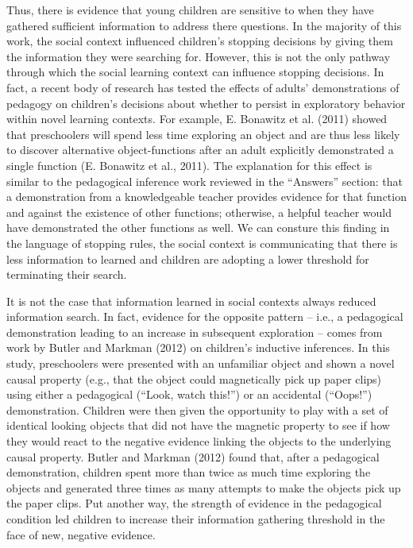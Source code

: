 \documentclass[english,floatsintext,man]{apa6}
\theoremstyle{definition}
\theoremstyle{definition}
\theoremstyle{definition}
\theoremstyle{remark}
\begin{document}
Thus, there is evidence that young children are sensitive to when they
have gathered sufficient information to address there questions. In the
majority of this work, the social context influenced children's stopping
decisions by giving them the information they were searching for.
However, this is not the only pathway through which the social learning
context can influence stopping decisions. In fact, a recent body of
research has tested the effects of adults' demonstrations of pedagogy on
children's decisions about whether to persist in exploratory behavior
within novel learning contexts. For example, E. Bonawitz et al. (2011)
showed that preschoolers will spend less time exploring an object and
are thus less likely to discover alternative object-functions after an
adult explicitly demonstrated a single function (E. Bonawitz et al.,
2011). The explanation for this effect is similar to the pedagogical
inference work reviewed in the \enquote{Answers} section: that a
demonstration from a knowledgeable teacher provides evidence for that
function and against the existence of other functions; otherwise, a
helpful teacher would have demonstrated the other functions as well. We
can consture this finding in the language of stopping rules, the social
context is communicating that there is less information to learned and
children are adopting a lower threshold for terminating their search.

It is not the case that information learned in social contexts always
reduced information search. In fact, evidence for the opposite pattern
-- i.e., a pedagogical demonstration leading to an increase in
subsequent exploration -- comes from work by Butler and Markman (2012)
on children's inductive inferences. In this study, preschoolers were
presented with an unfamiliar object and shown a novel causal property
(e.g., that the object could magnetically pick up paper clips) using
either a pedagogical (\enquote{Look, watch this!}) or an accidental
(\enquote{Oops!}) demonstration. Children were then given the
opportunity to play with a set of identical looking objects that did not
have the magnetic property to see if how they would react to the
negative evidence linking the objects to the underlying causal property.
Butler and Markman (2012) found that, after a pedagogical demonstration,
children spent more than twice as much time exploring the objects and
generated three times as many attempts to make the objects pick up the
paper clips. Put another way, the strength of evidence in the
pedagogical condition led children to increase their information
gathering threshold in the face of new, negative evidence.
\end{document}
